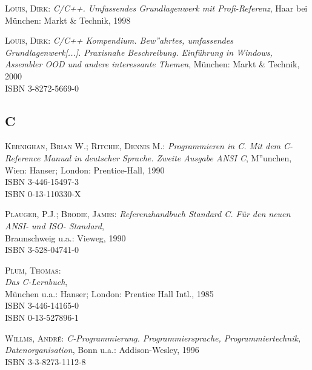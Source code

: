 \begin{description}

\item \textsc{Louis, Dirk}: \textit{C/C++. Umfassendes Grundlagenwerk
mit Profi-Referenz},
Haar bei M\"unchen: Markt \& Technik, 1998

\item \textsc{Louis, Dirk}: \textit{C/C++ Kompendium. Bew''ahrtes, umfassendes
Grundlagenwerk[...]. Praxisnahe Beschreibung. Einf\"uhrung in Windows,
Assembler OOD und andere interessante Themen}, M\"unchen: Markt \& Technik, 2000 \\
ISBN 3-8272-5669-0

\end{description}


\subsection{C}

\begin{description}
  
\item \textsc{Kernighan, Brian W.; Ritchie, Dennis M.}:
  \textit{Programmieren in C. Mit dem C-Reference Manual in deutscher
    Sprache. Zweite Ausgabe
    ANSI C}, M''unchen, Wien: Hanser; London: Prentice-Hall, 1990 \\
  ISBN 3-446-15497-3 \\
  ISBN 0-13-110330-X
  
\item \textsc{Plauger, P.J.; Brodie, James}: \textit{Referenzhandbuch
    Standard C. F\"ur den neuen ANSI- und ISO-
    Standard}, \\
  Braunschweig u.a.: Vieweg, 1990 \\
  ISBN 3-528-04741-0
  

\item \textsc{Plum, Thomas}: \\
  \textit{Das C-Lernbuch}, \\
  M\"unchen u.a.: Hanser; London: Prentice Hall Intl., 1985 \\
  ISBN 3-446-14165-0 \\
  ISBN 0-13-527896-1
  
\item \textsc{Willms, Andr\'e}: \textit{C-Programmierung.
    Programmiersprache, Programmiertechnik, Datenorganisation},
  Bonn u.a.: Addison-Wesley, 1996 \\
  ISBN 3-3-8273-1112-8

\end{description}

